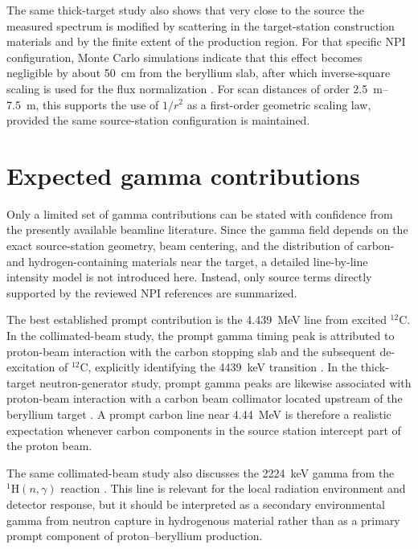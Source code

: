 The same thick-target study also shows that very close to the source the measured spectrum is modified by scattering in the target-station construction materials and by the finite extent of the production region. For that specific NPI configuration, Monte Carlo simulations indicate that this effect becomes negligible by about \SI{50}{cm} from the beryllium slab, after which inverse-square scaling is used for the flux normalization \citep{Majerle2023PBeGenerator}. For scan distances of order \SIrange{2.5}{7.5}{m}, this supports the use of \(1/r^{2}\) as a first-order geometric scaling law, provided the same source-station configuration is maintained.

\section{Expected gamma contributions}

Only a limited set of gamma contributions can be stated with confidence from the presently available beamline literature. Since the gamma field depends on the exact source-station geometry, beam centering, and the distribution of carbon- and hydrogen-containing materials near the target, a detailed line-by-line intensity model is not introduced here. Instead, only source terms directly supported by the reviewed NPI references are summarized.

The best established prompt contribution is the \SI{4.439}{MeV} line from excited \(^{12}\mathrm{C}\). In the collimated-beam study, the prompt gamma timing peak is attributed to proton-beam interaction with the carbon stopping slab and the subsequent de-excitation of \(^{12}\mathrm{C}\), explicitly identifying the \SI{4439}{keV} transition \citep{Ansorge2025CollimatedBeams}. In the thick-target neutron-generator study, prompt gamma peaks are likewise associated with proton-beam interaction with a carbon beam collimator located upstream of the beryllium target \citep{Majerle2023PBeGenerator}. A prompt carbon line near \SI{4.44}{MeV} is therefore a realistic expectation whenever carbon components in the source station intercept part of the proton beam.

The same collimated-beam study also discusses the \SI{2224}{keV} gamma from the \(^{1}\mathrm{H}(n,\gamma)\) reaction \citep{Ansorge2025CollimatedBeams}. This line is relevant for the local radiation environment and detector response, but it should be interpreted as a secondary environmental gamma from neutron capture in hydrogenous material rather than as a primary prompt component of proton--beryllium production.

